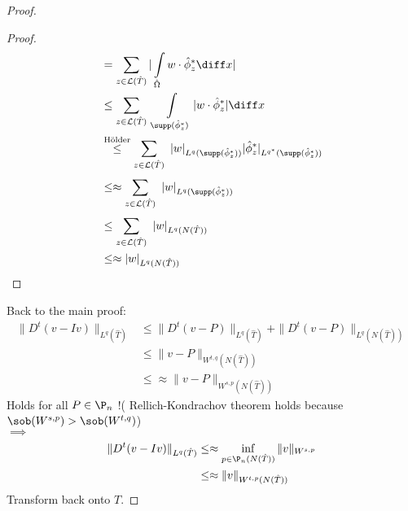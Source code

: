 \begin{proof}
\begin{itemize}
\begin{proof}
\begin{align*}
										&= \sum\limits_{z \in\mathcal{L}(\hat{T})}^{} |\int\limits_{\hat{\Omega}}w\cdot\hat{\phi}_{z}^*\diff x |\\
										&\leq \sum\limits_{z \in\mathcal{L}(\hat{T})}^{} \  \int\limits_{\supp(\hat{\phi}_{z}^*)} |w \cdot \hat{\phi}_{z}^*|\diff x \\
										&\overset{\text{Hölder}}{\leq} \sum\limits_{z \in\mathcal{L}(\hat{T})}^{} \ |w|_{L^q(\supp(\hat{\phi}_{z}^*))} |\hat{\phi}_{z}^*|_{L^{q^*}(\supp(\hat{\phi}_{z}^*))}\\
										&\leq\approx \sum\limits_{z \in\mathcal{L}(\hat{T})}^{} \ |w|_{L^q(\supp(\hat{\phi}_{z}^*))} \\
										&\leq \sum\limits_{z \in\mathcal{L}(\hat{T})}^{} \ |w|_{L^q(N(\hat{T}))} \\
										&\leq\approx |w|_{L^q(N(\hat{T}))} 
			\end{align*}
		\end{proof}
	\end{itemize}
	Back to the main proof:
	\begin{align*}
		\|D^t(v-Iv)\|_{L^{q}(\hat{T})} &\leq \|D^t(v-P)\|_{L^{q}(\hat{T})} + \|D^t(v-P)\|_{L^{q}(N(\hat{T}))}\\
									   &\leq \|v-P\|_{W^{t,q}(N(\hat{T}))}\\
									   &\leq\approx \|v-P\|_{W^{s,p}(N(\hat{T}))}
	\end{align*}
	Holds for all $P \in \P_{n}$ !( Rellich-Kondrachov theorem holds because $\sob(W^{s,p})>\sob(W^{t,q})$)\\
	$\implies$ 
	\begin{align*}
		\|D^t(v-Iv)\|_{L^{q}(\hat{T})} &\leq\approx \inf_{p \in \P_{n}(N(\hat{T}))} \|v\|_{W^{s,p}} \\
									   &\leq\approx \|v\|_{W^{t,p}(N(\hat{T}))}
	\end{align*}
	Transform back onto $T$.
\end{proof}


